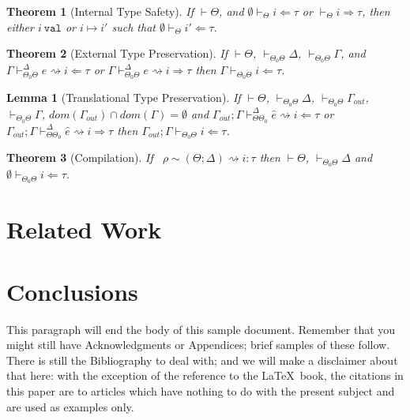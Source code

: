 \documentclass{sig-alternate}
\newtheorem{theorem}{Theorem}
\newtheorem{lemma}{Lemma}
\begin{document}
\begin{theorem}[Internal Type Safety]
If $\vdash\Theta$, and $\emptyset\vdash_{\Theta}i\Leftarrow\tau$ or $\vdash_{\Theta}i\Rightarrow\tau$, then either $i~\texttt{val}$ or $i\mapsto i'$ such that $\emptyset\vdash_{\Theta}i'\Leftarrow\tau$.
\end{theorem}

\begin{theorem}[External Type Preservation]
If $\vdash\Theta$, $\vdash_{\Theta_0\Theta}\Delta$, $\vdash_{\Theta_0\Theta}\Gamma$, and $\Gamma\vdash_{\Theta_0\Theta}^{\Delta} e\rightsquigarrow i\Leftarrow\tau$ or $\Gamma\vdash_{\Theta_0\Theta}^{\Delta} e\rightsquigarrow i\Rightarrow\tau$ then $\Gamma\vdash_{\Theta_0\Theta} i\Leftarrow\tau$.
\end{theorem}

\begin{lemma}[Translational Type Preservation]
If $\vdash\Theta$, $\vdash_{\Theta_0\Theta} \Delta$, $\vdash_{\Theta_0\Theta}\Gamma_{out}$, $\vdash_{\Theta_0\Theta}\Gamma$, $dom(\Gamma_{out})\cap dom(\Gamma)=\emptyset$ and $\Gamma_{out};\Gamma\vdash_{\Theta\Theta_0}^{\Delta}\hat{e}\rightsquigarrow i\Leftarrow\tau$ or $\Gamma_{out};\Gamma\vdash_{\Theta\Theta_0}^{\Delta}\hat{e}\rightsquigarrow i\Rightarrow \tau$ then $\Gamma_{out};\Gamma\vdash_{\Theta_0\Theta}i\Leftarrow \tau$.
\end{lemma}

\begin{theorem}[Compilation]
If ~$\rho\sim(\Theta;\Delta)\rightsquigarrow i:\tau$ then $\vdash\Theta$, $\vdash_{\Theta_0\Theta}\Delta$ and $\emptyset\vdash_{\Theta_0\Theta} i\Leftarrow\tau$.
\end{theorem}

%

\section{Related Work}\label{related}
\section{Conclusions}
This paragraph will end the body of this sample document.
Remember that you might still have Acknowledgments or
Appendices; brief samples of these
follow.  There is still the Bibliography to deal with; and
we will make a disclaimer about that here: with the exception
of the reference to the \LaTeX\ book, the citations in
this paper are to articles which have nothing to
do with the present subject and are used as
examples only.

%

%
%
\end{document}

